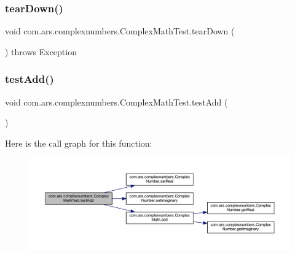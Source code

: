 \hypertarget{classcom_1_1ars_1_1complexnumbers_1_1_complex_math_test_aa0a4283d8c92cfd428208a61fb0b2753}{}\label{classcom_1_1ars_1_1complexnumbers_1_1_complex_math_test_aa0a4283d8c92cfd428208a61fb0b2753} 
\subsubsection{\texorpdfstring{tear\+Down()}{tearDown()}}
{\footnotesize\ttfamily void com.\+ars.\+complexnumbers.\+Complex\+Math\+Test.\+tear\+Down (\begin{DoxyParamCaption}{ }\end{DoxyParamCaption}) throws Exception}

\hypertarget{classcom_1_1ars_1_1complexnumbers_1_1_complex_math_test_a820df886e3c20f3cbe36ff6905e1d67e}{}\label{classcom_1_1ars_1_1complexnumbers_1_1_complex_math_test_a820df886e3c20f3cbe36ff6905e1d67e} 
\subsubsection{\texorpdfstring{test\+Add()}{testAdd()}}
{\footnotesize\ttfamily void com.\+ars.\+complexnumbers.\+Complex\+Math\+Test.\+test\+Add (\begin{DoxyParamCaption}{ }\end{DoxyParamCaption})}

Here is the call graph for this function\+:\nopagebreak
\begin{figure}[H]
\begin{center}
\leavevmode
\includegraphics[width=350pt]{classcom_1_1ars_1_1complexnumbers_1_1_complex_math_test_a820df886e3c20f3cbe36ff6905e1d67e_cgraph}
\end{center}
\end{figure}
\hypertarget{classcom_1_1ars_1_1complexnumbers_1_1_complex_math_test_a0dba8a864962376e684cfcbc1baa80f4}{}\label{classcom_1_1ars_1_1complexnumbers_1_1_complex_math_test_a0dba8a864962376e684cfcbc1baa80f4} 

